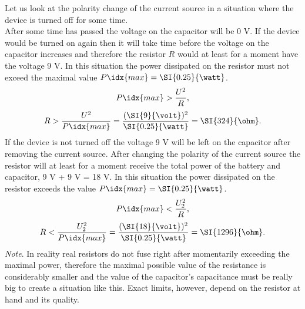 \solueng
Let us look at the polarity change of the current source in a situation where the device is turned off for some time.\\
After some time has passed the voltage on the capacitor will be 0 V. If the device would be turned on again then it will take time before the voltage on the capacitor increases and therefore the resistor $R$ would at least for a moment have the voltage 9 V. In this situation the power dissipated on the resistor must not exceed the maximal value $P\idx{max} = \SI{0.25}{\watt}$. 
\[P\idx{max} > \frac{U^2}{R},\] 
\[R > \frac{U^2}{P\idx{max}} = \frac{(\SI{9}{\volt})^2}{\SI{0.25}{\watt}} = \SI{324}{\ohm}. \]
If the device is not turned off the voltage 9 V will be left on the capacitor after removing the current source. After changing the polarity of the current source the resistor will at least for a moment receive the total power of the battery and capacitor, 9 V + 9 V = 18 V. In this situation the power dissipated on the resistor exceeds the value $P\idx{max} = \SI{0.25}{\watt}$. 
\[P\idx{max} < \frac{U_2^2}{R},\] 
\[R < \frac{U_2^2}{P\idx{max}} = \frac{(\SI{18}{\volt})^2}{\SI{0.25}{\watt}} = \SI{1296}{\ohm}. \]
\emph{Note}. In reality real resistors do not fuse right after momentarily exceeding the maximal power, therefore the maximal possible value of the resistance is considerably smaller and the value of the capacitor’s capacitance must be really big to create a situation like this. Exact limits, however, depend on the resistor at hand and its quality.
\probend